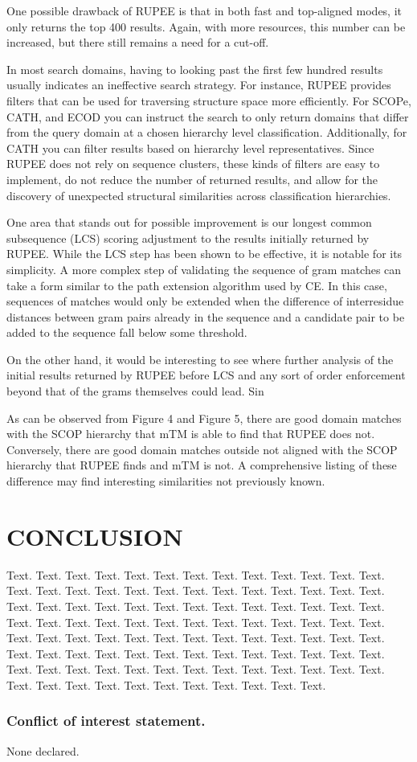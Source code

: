 \documentclass[a4,center,fleqn]{NAR}
\begin{document}
One possible drawback of RUPEE is that in both fast and top-aligned modes, it only returns the top 400 results. 
Again, with more resources, this number can be increased, but there still remains a need for a cut-off. 

In most search domains, having to looking past the first few hundred results usually indicates an ineffective search strategy.
For instance, RUPEE provides filters that can be used for traversing structure space more efficiently. 
For SCOPe, CATH, and ECOD you can instruct the search to only return domains that differ from the query domain at a chosen hierarchy level classification. 
Additionally, for CATH you can filter results based on hierarchy level representatives. 
Since RUPEE does not rely on sequence clusters, these kinds of filters are easy to implement, do not reduce the number of returned results, and allow for the discovery of unexpected structural similarities across classification hierarchies.  

One area that stands out for possible improvement is our longest common subsequence (LCS) scoring adjustment to the results initially returned by RUPEE. 
While the LCS step has been shown to be effective, it is notable for its simplicity. 
A more complex step of validating the sequence of gram matches can take a form similar to the path extension algorithm used by CE. 
In this case, sequences of matches would only be extended when the difference of interresidue distances between gram pairs already in the sequence and a candidate pair to be added to the sequence fall below some threshold.

On the other hand, it would be interesting to see where further analysis of the initial results returned by RUPEE before LCS and any sort of order enforcement beyond that of the grams themselves could lead. 
Sin

As can be observed from Figure 4 and Figure 5, there are good domain matches with the SCOP hierarchy that mTM is able to find that RUPEE does not. 
Conversely, there are good domain matches outside not aligned with the SCOP hierarchy that RUPEE finds and mTM is not. 
A comprehensive listing of these difference may find interesting similarities not previously known. 

\section{CONCLUSION}

Text. Text. Text. Text. Text. Text. Text. Text. Text. Text. Text.
Text. Text. Text. Text. Text. Text. Text. Text. Text. Text. Text.
Text. Text. Text. Text. Text. Text. Text. Text. Text. Text. Text.
Text. Text. Text. Text. Text. Text. Text. Text. Text. Text. Text.
Text. Text. Text. Text. Text. Text. Text. Text. Text. Text. Text.
Text. Text. Text. Text. Text. Text. Text. Text. Text. Text. Text.
Text. Text. Text. Text. Text. Text. Text. Text. Text. Text. Text.
Text. Text. Text. Text. Text. Text. Text. Text. Text. Text. Text.
Text. Text. Text. Text. Text. Text. Text. Text. Text. Text. Text.
Text. Text. Text.

\subsubsection{Conflict of interest statement.} None declared.
\newpage

\nocite{Ayoub2017}
\nocite{BioJava2012}


\end{document}
